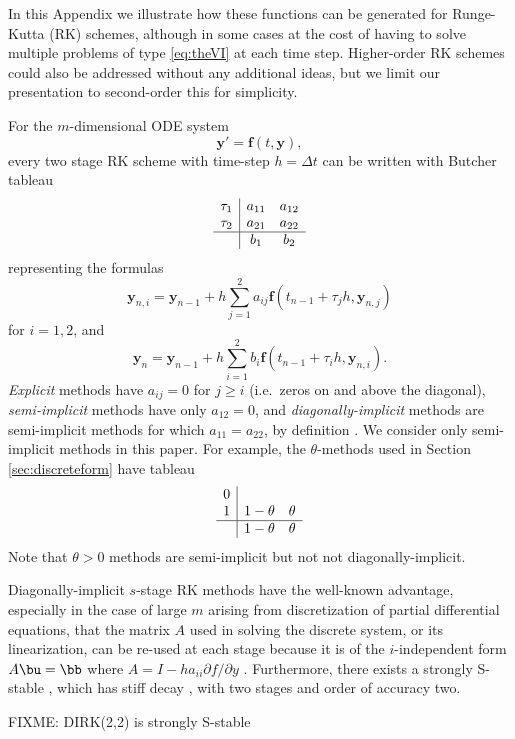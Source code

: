 \documentclass[final,leqno,onefignum,onetabnum]{siamltex1213bueler}
\newcommand\bbf{\mathbf{f}}
\newcommand\by{\mathbf{y}}
\begin{document}
In this Appendix we illustrate how these functions can be generated for Runge-Kutta (RK) schemes, although in some cases at the cost of having to solve multiple problems of type \eqref{eq:theVI} at each time step.  Higher-order RK schemes could also be addressed without any additional ideas, but we limit our presentation to second-order this for simplicity.

For the $m$-dimensional ODE system
  $$\by' = \bbf(t,\by),$$
every two stage RK scheme with time-step $h=\Delta t$ can be written with Butcher tableau \cite{AscherPetzold}
  $$
\begin{array}{c|cc}
\tau_1 & a_{11} & a_{12}  \\
\tau_2 & a_{21} & a_{22}  \\ \hline
       & b_1   & b_2  \\
\end{array}$$
representing the formulas
  $$\by_{n,i} = \by_{n-1} + h \sum_{j=1}^2 a_{ij} \bbf(t_{n-1} + \tau_j h, \by_{n,j})$$
for $i=1,2$, and
  $$\by_n = \by_{n-1} + h \sum_{i=1}^2 b_i \bbf(t_{n-1} + \tau_i h, \by_{n,i}).$$
\emph{Explicit} methods have $a_{ij}=0$ for $j\ge i$ (i.e.~zeros on and above the diagonal), \emph{semi-implicit} methods have only $a_{12}=0$, and \emph{diagonally-implicit} methods are semi-implicit methods for which $a_{11}=a_{22}$, by definition \cite{Alexander1977}.  We consider only semi-implicit methods in this paper.  For example, the $\theta$-methods used in Section \ref{sec:discreteform} have tableau
  $$
\begin{array}{c|cc}
0 &          &   \\
1 & 1-\theta & \theta  \\ \hline
  & 1-\theta & \theta  \\
\end{array}$$
Note that $\theta>0$ methods are semi-implicit but not not diagonally-implicit.

Diagonally-implicit $s$-stage RK methods have the well-known advantage, especially in the case of large $m$ arising from discretization of partial differential equations, that the matrix $A$ used in solving the discrete system, or its linearization, can be re-used at each stage because it is of the $i$-independent form $A \bu = \bb$ where $A = I - h a_{ii} \partial f/\partial y$ \cite{Alexander1977,AscherPetzold}.  Furthermore, there exists a strongly S-stable \cite{Alexander1977}, which has stiff decay \cite{AscherPetzold}, with two stages and order of accuracy two.  

FIXME: DIRK(2,2) is strongly S-stable \cite{Alexander1977}
\end{document}
